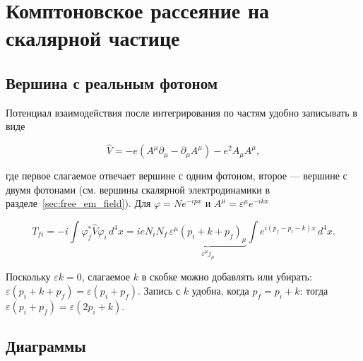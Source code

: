 \documentclass[../final.tex]{subfiles}
\begin{document}
\ifSubfilesClassLoaded{\setcounter{chapter}{2}\setcounter{section}{10}}{}



\section{Комптоновское рассеяние на скалярной частице}

\subsection{Вершина с реальным фотоном}

Потенциал взаимодействия после интегрирования по частям
удобно записывать в виде

\begin{equation*}
    \hat V
    =
    -e\left(A^\mu\partial_\mu-\partial_\mu A^\mu\right)
    -e^2A_\mu A^\mu,
\end{equation*}

где первое слагаемое отвечает вершине с одним фотоном,
второе --- вершине с двумя фотонами
(см. вершины скалярной электродинамики в разделе~\ref{sec:free_em_field}).
Для $\varphi=Ne^{-ipx}$ и $A^\mu=\varepsilon^\mu e^{-ikx}$

\begin{equation*}
    T_{fi}
    =
    -i\int\varphi_f^*\hat V\varphi_i\,d^4x
    =
    ieN_iN_f\,
    \underbrace{
        \varepsilon^\mu\left(p_i+k+p_f\right)_\mu
    }_{\varepsilon^\mu j_\mu}
    \int e^{i(p_f-p_i-k)x}\,d^4x.
\end{equation*}

\remark
Поскольку $\varepsilon k=0$, слагаемое $k$ в скобке можно
добавлять или убирать: $\varepsilon(p_i+k+p_f)=\varepsilon(p_i+p_f)$.
Запись с $k$ удобна, когда $p_f=p_i+k$:
тогда $\varepsilon(p_i+p_f)=\varepsilon(2p_i+k)$.


\subsection{Диаграммы}
\end{document}
